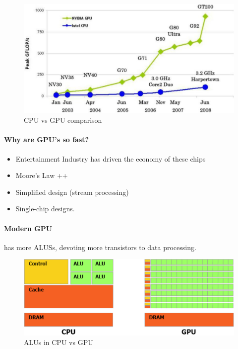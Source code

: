 \begin{figure}[h]
    \centering
    \includegraphics[width=\linewidth]{images/cpu-vs-gpu-performance}
    \caption{CPU vs GPU comparison}
    \label{fig:cpu-vs-gpu-performance}
\end{figure}

\paragraph{Why are GPU's so fast?}
\begin{itemize}
    \item Entertainment Industry has driven the economy
    of these chips
    \item Moore’s Law ++
    \item Simplified design (stream processing)
    \item Single-chip designs.
\end{itemize}

\paragraph{Modern GPU} has more ALUSs, devoting more transistors to data processing.
\begin{figure}[h]
    \centering
    \includegraphics[width = \linewidth]{images/gpu-alu-s}
    \caption{ALUs in CPU vs GPU}
    \label{fig:gpu-alu-s}
\end{figure}

